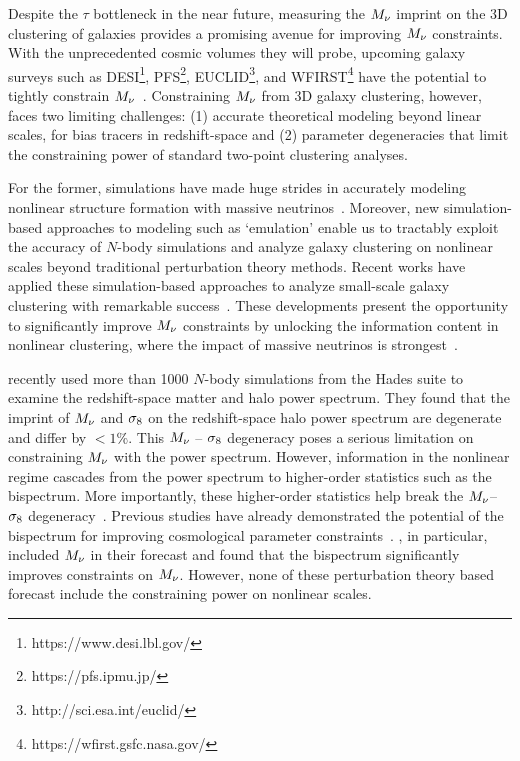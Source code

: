 Despite the $\tau$ bottleneck in the near future, measuring the $M_\nu$ imprint 
on the 3D clustering of galaxies provides a promising avenue for improving $M_\nu$ constraints. With the
unprecedented cosmic volumes they will probe, upcoming galaxy surveys 
such as DESI\footnote{https://www.desi.lbl.gov/}, PFS\footnote{https://pfs.ipmu.jp/}, 
EUCLID\footnote{http://sci.esa.int/euclid/}, and WFIRST\footnote{https://wfirst.gsfc.nasa.gov/} 
have the potential to tightly constrain $M_\nu$~\citep{audren2013, font-ribera2014, petracca2016, sartoris2016, boyle2018}.
Constraining $M_\nu$ from 3D galaxy clustering, however, faces two limiting
challenges: (1) accurate theoretical modeling beyond linear scales, for bias
tracers in redshift-space and (2) parameter degeneracies that limit the
constraining power of standard two-point clustering analyses. 

For the former, simulations have made huge strides in accurately modeling 
nonlinear structure formation with massive neutrinos~\citep[\eg][]{brandbyge2008, 
villaescusa-navarro2013, castorina2015, adamek2017, emberson2017, banerjee2018, 
villaescusa-navarro2018, villaescusa-navarro2019}. Moreover, new simulation-based
approaches to modeling such as `emulation' enable us to tractably exploit the accuracy of 
$N$-body simulations and analyze galaxy clustering on nonlinear scales beyond
traditional perturbation theory methods. Recent works have applied
these simulation-based approaches to analyze small-scale galaxy clustering with
remarkable success~\citep[\eg][]{heitmann2009, kwan2015, euclidcollaboration2018, lange2019, zhai2019, wibking2019}. 
These developments present the opportunity to significantly improve $M_\nu$
constraints by unlocking the information content in nonlinear clustering, where
the impact of massive neutrinos is strongest~\citep[\eg][]{brandbyge2008,
saito2008, wong2008, saito2009, viel2010, agarwal2011, marulli2011, bird2012,
castorina2015, banerjee2016, upadhye2016}.

\cite{villaescusa-navarro2018} recently used more than 1000 $N$-body
simulations from the {\sc Hades} suite to examine the redshift-space matter and
halo power spectrum.  They found that the imprint of $M_\nu$ and $\sigma_8$ on the
redshift-space halo power spectrum are degenerate and differ by $< 1\%$. This
$M_\nu$ -- $\sigma_8$ degeneracy poses a serious limitation on constraining $M_\nu$
with the power spectrum. However, information in the nonlinear regime cascades
from the power spectrum to higher-order statistics such as the bispectrum. More
importantly, these higher-order statistics help break the $M_\nu$--$\sigma_8$ 
degeneracy~\citep{hahn2020}. Previous studies have already demonstrated the
potential of the bispectrum for improving cosmological parameter
constraints~\citep{sefusatti2005, sefusatti2006, chan2017, yankelevich2019,
agarwal2020}.
\cite{chudaykin2019}, in particular, included $M_\nu$ in their forecast and
found that the bispectrum significantly improves constraints on $M_\nu$.
However, none of these perturbation theory based forecast include the
constraining power on nonlinear scales. 

